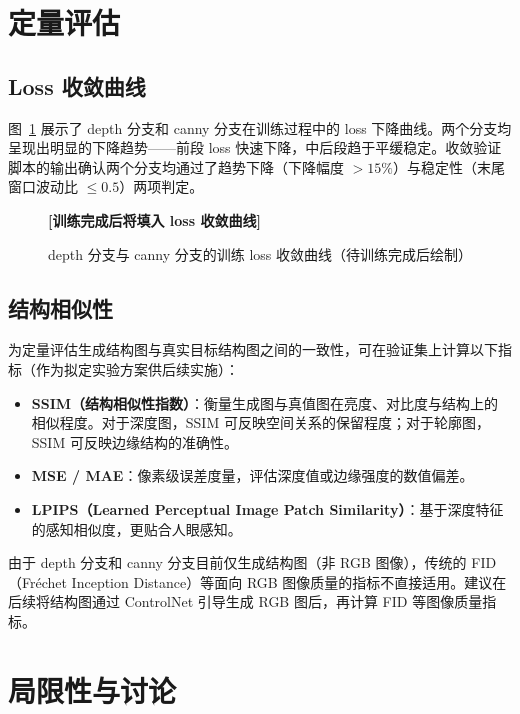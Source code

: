 \section{定量评估}

\subsection{Loss 收敛曲线}

图~\ref{fig:loss_curves} 展示了 depth 分支和 canny 分支在训练过程中的 loss 下降曲线。两个分支均呈现出明显的下降趋势——前段 loss 快速下降，中后段趋于平缓稳定。收敛验证脚本的输出确认两个分支均通过了趋势下降（下降幅度 $> 15\%$）与稳定性（末尾窗口波动比 $\leq 0.5$）两项判定。

\begin{figure}[H]
    \centering
    \textbf{[训练完成后将填入 loss 收敛曲线]}
    \caption{depth 分支与 canny 分支的训练 loss 收敛曲线（待训练完成后绘制）}
    \label{fig:loss_curves}
\end{figure}

\subsection{结构相似性}

为定量评估生成结构图与真实目标结构图之间的一致性，可在验证集上计算以下指标（作为拟定实验方案供后续实施）：

\begin{itemize}
    \item \textbf{SSIM（结构相似性指数）}：衡量生成图与真值图在亮度、对比度与结构上的相似程度。对于深度图，SSIM 可反映空间关系的保留程度；对于轮廓图，SSIM 可反映边缘结构的准确性。
    \item \textbf{MSE / MAE}：像素级误差度量，评估深度值或边缘强度的数值偏差。
    \item \textbf{LPIPS（Learned Perceptual Image Patch Similarity）}：基于深度特征的感知相似度，更贴合人眼感知。
\end{itemize}

由于 depth 分支和 canny 分支目前仅生成结构图（非 RGB 图像），传统的 FID（Fréchet Inception Distance）等面向 RGB 图像质量的指标不直接适用。建议在后续将结构图通过 ControlNet 引导生成 RGB 图后，再计算 FID 等图像质量指标。

\section{局限性与讨论}
\label{sec:limitations}

